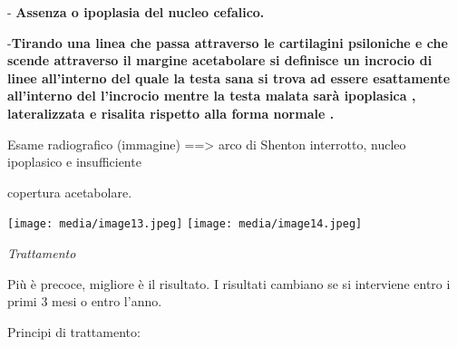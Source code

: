\documentclass[]{article}
\begin{document}
- \textbf{Assenza o ipoplasia del nucleo cefalico. }

-\textbf{Tirando una linea che passa attraverso le cartilagini
psiloniche e che scende attraverso il margine acetabolare si definisce
un incrocio di linee all'interno del quale la testa sana si trova ad
essere esattamente all'interno del l'incrocio mentre la testa malata
sarà ipoplasica , lateralizzata e risalita rispetto alla forma normale
.}

Esame radiografico (immagine) ==\textgreater{} arco di Shenton
interrotto, nucleo ipoplasico e insufficiente

copertura acetabolare.

\texttt{[image: media/image13.jpeg]}
\texttt{[image: media/image14.jpeg]}

\emph{Trattamento}

Più è precoce, migliore è il risultato. I risultati cambiano se si
interviene entro i primi 3 mesi o entro l'anno.

Principi di trattamento:
\end{document}
